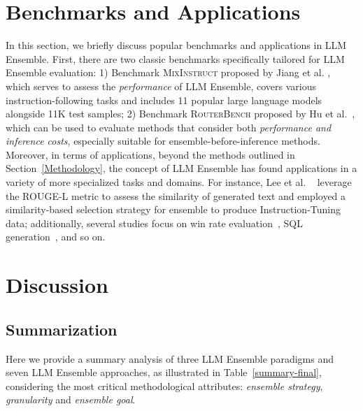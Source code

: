 \documentclass{article}
\begin{document}
\section{Benchmarks and Applications}
In this section, we briefly discuss popular benchmarks and applications in LLM Ensemble.
First, there are two classic benchmarks specifically tailored for LLM Ensemble evaluation: 
1) Benchmark \textsc{MixInstruct} proposed by Jiang et al. , which serves to assess the \textit{performance} of LLM Ensemble, covers various instruction-following tasks and includes 11 popular large language models
alongside 11K test samples;
2) Benchmark \textsc{RouterBench} proposed by Hu et al.~, 
which can be used to evaluate methods that consider both \textit{performance and inference costs}, especially suitable for ensemble-before-inference methods.
Moreover, in terms of applications, beyond the methods outlined in Section~\ref{Methodology}, the concept of LLM Ensemble has found applications in a variety of more specialized tasks and domains. 
For instance, Lee et al. ~ leverage the ROUGE-L metric to assess the similarity of generated text and employed a similarity-based selection strategy for ensemble to produce Instruction-Tuning data; 
additionally, several studies focus on win rate evaluation~\cite{gao2024bayesian}, SQL generation~\cite{gundabathula2024promptmind}, and so on.








\section{Discussion}




\subsection{Summarization}


Here we provide a summary analysis of three LLM Ensemble paradigms and seven LLM Ensemble approaches, as illustrated in Table~\ref{summary-final}, considering the most critical methodological attributes:
\textit{ensemble strategy}, \textit{granularity} and \textit{ensemble goal}.
\end{document}
